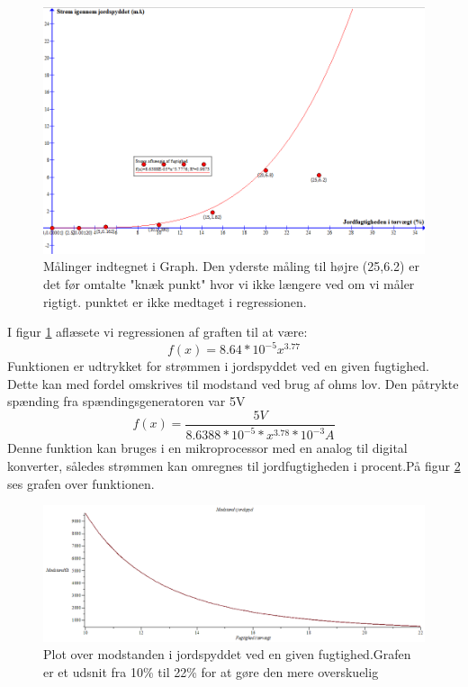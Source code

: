 \begin{figure}[H]
	\centering 
	\includegraphics[scale=0.6]{HardwareArkitektur/Sensore/Jordfugt_billeder/Graph_jordfugtighed.PNG}
	\caption{Målinger indtegnet i Graph. Den yderste måling til højre (25,6.2) er det før omtalte "knæk punkt" hvor vi ikke længere ved om vi måler rigtigt. punktet er ikke medtaget i regressionen.}
	\label{photo:Graph_jordfugtighed}
\end{figure}  

I figur \ref{photo:Graph_jordfugtighed} aflæsete vi regressionen af graften til at være:
$$f(x) = 8.64*10^{-5}x^{3.77} $$
Funktionen er udtrykket for strømmen i jordspyddet ved en given fugtighed. Dette kan med fordel omskrives til modstand ved brug af ohms lov. Den påtrykte spænding fra spændingsgeneratoren var 5V
$$f(x) = \frac{5V}{{8.6388*10^{-5}*x^{3.78}*10^{-3}A}}$$
Denne funktion kan bruges i en mikroprocessor med en analog til digital konverter, således strømmen kan omregnes til jordfugtigheden i procent.På figur \ref{photo:jordspyd_modstand} ses grafen over funktionen. 

\begin{figure}[H]
	\centering 
	\includegraphics[scale=0.4]{HardwareArkitektur/Sensore/Jordfugt_billeder/jordspyd_modstand.PNG}
	\caption{Plot over modstanden i jordspyddet ved en given fugtighed.Grafen er et udsnit fra 10\% til 22\% for at gøre den mere overskuelig}
	\label{photo:jordspyd_modstand}
\end{figure}  

